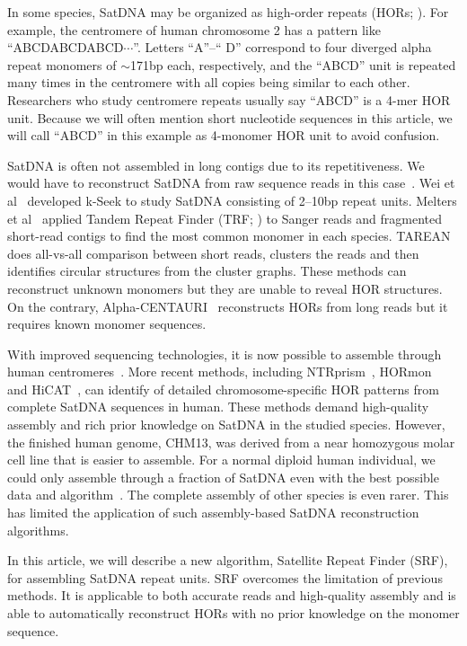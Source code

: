 \documentclass{bioinfo}
\begin{document}
In some species, SatDNA may be organized as high-order repeats
(HORs; \citealt{Miga:2019aa}).  For example, the centromere of human chromosome 2
has a pattern like ``{\sf ABCDABCDABCD$\cdots$}''. Letters ``{\sf A}''--``{\sf
D}'' correspond to four diverged alpha repeat monomers of $\sim$171bp each,
respectively, and the ``{\sf ABCD}'' unit is repeated many times in the
centromere with all copies being similar to each other. Researchers who study
centromere repeats usually say ``{\sf ABCD}'' is a 4-mer HOR unit. Because we
will often mention short nucleotide sequences in this article, we will call
``{\sf ABCD}'' in this example as 4-monomer HOR unit to avoid confusion.

SatDNA is often not assembled in long contigs due to its repetitiveness.
We would have to reconstruct SatDNA from raw sequence reads in this
case~\citep{Lower:2018aa}.  Wei et al~\citep{Wei:2014vl} developed k-Seek to
study SatDNA consisting of 2--10bp repeat units. Melters et
al~\citep{Melters:2013va} applied Tandem Repeat Finder (TRF;
\citealt{Benson:1999aa}) to Sanger reads and fragmented short-read contigs to
find the most common monomer in each species.  TAREAN~\citep{Novak:2017wx} does
all-vs-all comparison between short reads, clusters the reads and then
identifies circular structures from the cluster graphs. These methods can
reconstruct unknown monomers but they are unable to reveal HOR structures. On
the contrary, Alpha-CENTAURI~\citep{Sevim:2016tl} reconstructs HORs from long
reads but it requires known monomer sequences.

With improved sequencing technologies, it is now possible to assemble through
human centromeres~\citep{Nurk:2022up}. More recent methods, including
NTRprism~\citep{Altemose:2022tv}, HORmon~\citep{Kunyavskaya:2022tx} and
HiCAT~\citep{Gao2022.08.07.502881}, can identify of detailed
chromosome-specific HOR patterns from complete SatDNA sequences in human. These
methods demand high-quality assembly and rich prior knowledge on SatDNA in the
studied species. However, the finished human genome, CHM13, was derived from a
near homozygous molar cell line that is easier to assemble. For a normal
diploid human individual, we could only assemble through a fraction of SatDNA
even with the best possible data and
algorithm~\citep{Rautiainen2022.06.24.497523}. The complete assembly of other
species is even rarer. This has limited the application of such assembly-based
SatDNA reconstruction algorithms.

In this article, we will describe a new algorithm, Satellite Repeat Finder
(SRF), for assembling SatDNA repeat units. SRF overcomes the limitation of
previous methods. It is applicable to both accurate reads and high-quality
assembly and is able to automatically reconstruct HORs with no prior knowledge
on the monomer sequence.
\end{document}
